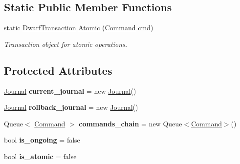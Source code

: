 \subsection*{Static Public Member Functions}
\begin{DoxyCompactItemize}
\item 
static \hyperlink{class_dwarf_d_b_1_1_transactions_1_1_dwarf_transaction}{DwarfTransaction} \hyperlink{class_dwarf_d_b_1_1_transactions_1_1_dwarf_transaction_a660b18b542e2053f8d8b70555ee3d5d1}{Atomic} (\hyperlink{class_dwarf_d_b_1_1_dwarf_command_1_1_command}{Command} cmd)
\begin{DoxyCompactList}\small\item\em Transaction object for atomic operations. \item\end{DoxyCompactList}\end{DoxyCompactItemize}
\subsection*{Protected Attributes}
\begin{DoxyCompactItemize}
\item 
\hypertarget{class_dwarf_d_b_1_1_transactions_1_1_dwarf_transaction_ac669e201c78debaf241d4ae53bb8c8b6}{
\hyperlink{class_dwarf_d_b_1_1_transaction_journals_1_1_journal}{Journal} {\bfseries current\_\-journal} = new \hyperlink{class_dwarf_d_b_1_1_transaction_journals_1_1_journal}{Journal}()}
\label{class_dwarf_d_b_1_1_transactions_1_1_dwarf_transaction_ac669e201c78debaf241d4ae53bb8c8b6}

\item 
\hypertarget{class_dwarf_d_b_1_1_transactions_1_1_dwarf_transaction_a619358ab756eca4ff000419621e59aac}{
\hyperlink{class_dwarf_d_b_1_1_transaction_journals_1_1_journal}{Journal} {\bfseries rollback\_\-journal} = new \hyperlink{class_dwarf_d_b_1_1_transaction_journals_1_1_journal}{Journal}()}
\label{class_dwarf_d_b_1_1_transactions_1_1_dwarf_transaction_a619358ab756eca4ff000419621e59aac}

\item 
\hypertarget{class_dwarf_d_b_1_1_transactions_1_1_dwarf_transaction_aed2da7c0b57d388603a0c229003381bb}{
Queue$<$ \hyperlink{class_dwarf_d_b_1_1_dwarf_command_1_1_command}{Command} $>$ {\bfseries commands\_\-chain} = new Queue$<$\hyperlink{class_dwarf_d_b_1_1_dwarf_command_1_1_command}{Command}$>$()}
\label{class_dwarf_d_b_1_1_transactions_1_1_dwarf_transaction_aed2da7c0b57d388603a0c229003381bb}

\item 
\hypertarget{class_dwarf_d_b_1_1_transactions_1_1_dwarf_transaction_af7c5ad53ad36cfa8537bf9faf0c0f694}{
bool {\bfseries is\_\-ongoing} = false}
\label{class_dwarf_d_b_1_1_transactions_1_1_dwarf_transaction_af7c5ad53ad36cfa8537bf9faf0c0f694}

\item 
\hypertarget{class_dwarf_d_b_1_1_transactions_1_1_dwarf_transaction_afcb3f9b3732ab553abd49f939696178e}{
bool {\bfseries is\_\-atomic} = false}
\label{class_dwarf_d_b_1_1_transactions_1_1_dwarf_transaction_afcb3f9b3732ab553abd49f939696178e}

\end{DoxyCompactItemize}


